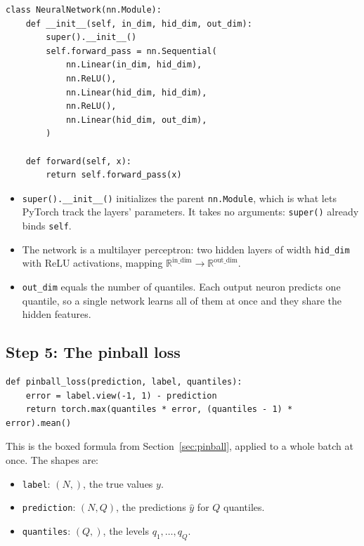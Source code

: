 \documentclass[11pt]{article}
\begin{document}
\begin{lstlisting}
class NeuralNetwork(nn.Module):
    def __init__(self, in_dim, hid_dim, out_dim):
        super().__init__()
        self.forward_pass = nn.Sequential(
            nn.Linear(in_dim, hid_dim),
            nn.ReLU(),
            nn.Linear(hid_dim, hid_dim),
            nn.ReLU(),
            nn.Linear(hid_dim, out_dim),
        )

    def forward(self, x):
        return self.forward_pass(x)
\end{lstlisting}

\begin{itemize}
  \item \texttt{super().\_\_init\_\_()} initializes the parent
        \texttt{nn.Module}, which is what lets PyTorch track the layers'
        parameters. It takes no arguments: \texttt{super()} already binds
        \texttt{self}.
  \item The network is a multilayer perceptron: two hidden layers of width
        \texttt{hid\_dim} with ReLU activations, mapping
        $\mathbb{R}^{\text{in\_dim}} \to \mathbb{R}^{\text{out\_dim}}$.
  \item \texttt{out\_dim} equals the number of quantiles. Each output neuron
        predicts one quantile, so a single network learns all of them at once
        and they share the hidden features.
\end{itemize}

\subsection{Step 5: The pinball loss}

\begin{lstlisting}
def pinball_loss(prediction, label, quantiles):
    error = label.view(-1, 1) - prediction
    return torch.max(quantiles * error, (quantiles - 1) * error).mean()
\end{lstlisting}

This is the boxed formula from Section~\ref{sec:pinball}, applied to a whole
batch at once. The shapes are:

\begin{itemize}
  \item \texttt{label}: $(N,)$, the true values $y$.
  \item \texttt{prediction}: $(N, Q)$, the predictions $\hat y$ for $Q$ quantiles.
  \item \texttt{quantiles}: $(Q,)$, the levels $q_1,\dots,q_Q$.
\end{itemize}
\end{document}
